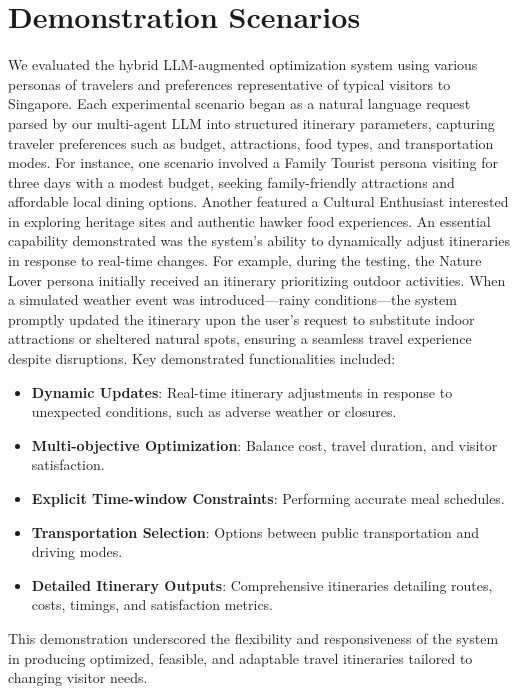 \documentclass{ecai}
\begin{document}
\section{Demonstration Scenarios}
We evaluated the hybrid LLM-augmented optimization system using various personas of travelers and preferences representative of typical visitors to Singapore. Each experimental scenario began as a natural language request parsed by our multi-agent LLM into structured itinerary parameters, capturing traveler preferences such as budget, attractions, food types, and transportation modes.
For instance, one scenario involved a Family Tourist persona visiting for three days with a modest budget, seeking family-friendly attractions and affordable local dining options. Another featured a Cultural Enthusiast interested in exploring heritage sites and authentic hawker food experiences.
An essential capability demonstrated was the system’s ability to dynamically adjust itineraries in response to real-time changes. For example, during the testing, the Nature Lover persona initially received an itinerary prioritizing outdoor activities. When a simulated weather event was introduced—rainy conditions—the system promptly updated the itinerary upon the user's request to substitute indoor attractions or sheltered natural spots, ensuring a seamless travel experience despite disruptions. 
Key demonstrated functionalities included:
\begin{itemize}
    \item \textbf{Dynamic Updates}: Real-time itinerary adjustments in response to unexpected conditions, such as adverse weather or closures.
    \item \textbf{Multi-objective Optimization}: Balance cost, travel duration, and visitor satisfaction.
    \item \textbf{Explicit Time-window Constraints}: Performing accurate meal schedules.
    \item \textbf{Transportation Selection}: Options between public transportation and driving modes.
    \item \textbf{Detailed Itinerary Outputs}: Comprehensive itineraries detailing routes, costs, timings, and satisfaction metrics.
\end{itemize}
This demonstration underscored the flexibility and responsiveness of the system in producing optimized, feasible, and adaptable travel itineraries tailored to changing visitor needs.
\end{document}
